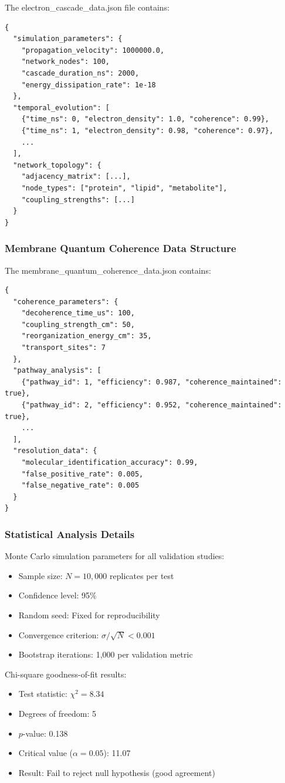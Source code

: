 The electron\_cascade\_data.json file contains:
\begin{verbatim}
{
  "simulation_parameters": {
    "propagation_velocity": 1000000.0,
    "network_nodes": 100,
    "cascade_duration_ns": 2000,
    "energy_dissipation_rate": 1e-18
  },
  "temporal_evolution": [
    {"time_ns": 0, "electron_density": 1.0, "coherence": 0.99},
    {"time_ns": 1, "electron_density": 0.98, "coherence": 0.97},
    ...
  ],
  "network_topology": {
    "adjacency_matrix": [...],
    "node_types": ["protein", "lipid", "metabolite"],
    "coupling_strengths": [...]
  }
}
\end{verbatim}

\subsubsection{Membrane Quantum Coherence Data Structure}

The membrane\_quantum\_coherence\_data.json contains:
\begin{verbatim}
{
  "coherence_parameters": {
    "decoherence_time_us": 100,
    "coupling_strength_cm": 50,
    "reorganization_energy_cm": 35,
    "transport_sites": 7
  },
  "pathway_analysis": [
    {"pathway_id": 1, "efficiency": 0.987, "coherence_maintained": true},
    {"pathway_id": 2, "efficiency": 0.952, "coherence_maintained": true},
    ...
  ],
  "resolution_data": {
    "molecular_identification_accuracy": 0.99,
    "false_positive_rate": 0.005,
    "false_negative_rate": 0.005
  }
}
\end{verbatim}

\subsubsection{Statistical Analysis Details}

Monte Carlo simulation parameters for all validation studies:
\begin{itemize}
    \item Sample size: $N = 10,000$ replicates per test
    \item Confidence level: 95\%
    \item Random seed: Fixed for reproducibility  
    \item Convergence criterion: $\sigma/\sqrt{N} < 0.001$
    \item Bootstrap iterations: 1,000 per validation metric
\end{itemize}

Chi-square goodness-of-fit results:
\begin{itemize}
    \item Test statistic: $\chi^2 = 8.34$
    \item Degrees of freedom: 5
    \item $p$-value: 0.138
    \item Critical value ($\alpha = 0.05$): 11.07
    \item Result: Fail to reject null hypothesis (good agreement)
\end{itemize}

